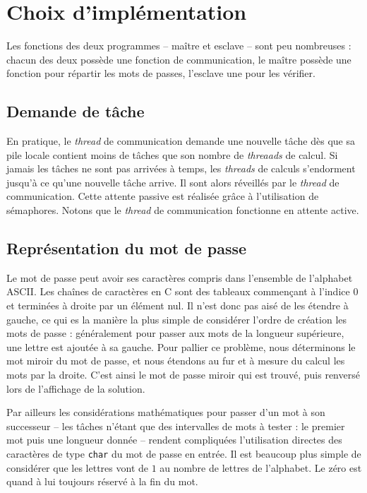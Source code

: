 \section{Choix d'implémentation} %
\label{sec:impl}

Les fonctions des deux programmes -- maître et esclave -- sont peu nombreuses : chacun des deux possède une fonction de communication, le maître possède une fonction pour répartir les mots de passes, l'esclave une pour les vérifier.

\subsection{Demande de tâche} %

En pratique, le \emph{thread} de communication demande une nouvelle tâche dès que sa pile locale contient moins de tâches que son nombre de \emph{threaads} de calcul. Si jamais les tâches ne sont pas arrivées à temps, les \emph{threads} de calculs s'endorment jusqu'à ce qu'une nouvelle tâche arrive. Il sont alors réveillés par le \emph{thread} de communication. Cette attente passive est réalisée grâce à l'utilisation de sémaphores. Notons que le \emph{thread} de communication fonctionne en attente active.

\subsection{Représentation du mot de passe}

Le mot de passe peut avoir ses caractères compris dans l'ensemble de l'alphabet \textsf{ASCII}. Les chaînes de caractères en \textsf{C} sont des tableaux commençant à l'indice $0$ et terminées à droite par un élément nul. Il n'est donc pas aisé de les étendre à gauche, ce qui es la manière la plus simple de considérer l'ordre de création les mots de passe : généralement pour passer aux mots de la longueur supérieure, une lettre est ajoutée à sa gauche. Pour pallier ce problème, nous déterminons le mot miroir du mot de passe, et nous étendons au fur et à mesure du calcul les mots par la droite. C'est ainsi le mot de passe miroir qui est trouvé, puis renversé lors de l'affichage de la solution.

Par ailleurs les considérations mathématiques pour passer d'un mot à son successeur -- les tâches n'étant que des intervalles de mots à tester : le premier mot puis une longueur donnée -- rendent compliquées l'utilisation directes des caractères de type \texttt{char} du mot de passe en entrée. Il est beaucoup plus simple de considérer que les lettres vont de $1$ au nombre de lettres de l'alphabet. Le zéro est quand à lui toujours réservé à la fin du mot.


